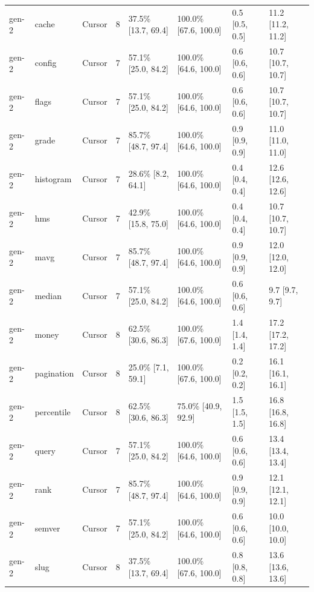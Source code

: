 \begin{tabular}{llllllll}
gen-2 & cache & Cursor & 8 & 37.5\% [13.7, 69.4] & 100.0\% [67.6, 100.0] & 0.5 [0.5, 0.5] & 11.2 [11.2, 11.2] \\
gen-2 & config & Cursor & 7 & 57.1\% [25.0, 84.2] & 100.0\% [64.6, 100.0] & 0.6 [0.6, 0.6] & 10.7 [10.7, 10.7] \\
gen-2 & flags & Cursor & 7 & 57.1\% [25.0, 84.2] & 100.0\% [64.6, 100.0] & 0.6 [0.6, 0.6] & 10.7 [10.7, 10.7] \\
gen-2 & grade & Cursor & 7 & 85.7\% [48.7, 97.4] & 100.0\% [64.6, 100.0] & 0.9 [0.9, 0.9] & 11.0 [11.0, 11.0] \\
gen-2 & histogram & Cursor & 7 & 28.6\% [8.2, 64.1] & 100.0\% [64.6, 100.0] & 0.4 [0.4, 0.4] & 12.6 [12.6, 12.6] \\
gen-2 & hms & Cursor & 7 & 42.9\% [15.8, 75.0] & 100.0\% [64.6, 100.0] & 0.4 [0.4, 0.4] & 10.7 [10.7, 10.7] \\
gen-2 & mavg & Cursor & 7 & 85.7\% [48.7, 97.4] & 100.0\% [64.6, 100.0] & 0.9 [0.9, 0.9] & 12.0 [12.0, 12.0] \\
gen-2 & median & Cursor & 7 & 57.1\% [25.0, 84.2] & 100.0\% [64.6, 100.0] & 0.6 [0.6, 0.6] & 9.7 [9.7, 9.7] \\
gen-2 & money & Cursor & 8 & 62.5\% [30.6, 86.3] & 100.0\% [67.6, 100.0] & 1.4 [1.4, 1.4] & 17.2 [17.2, 17.2] \\
gen-2 & pagination & Cursor & 8 & 25.0\% [7.1, 59.1] & 100.0\% [67.6, 100.0] & 0.2 [0.2, 0.2] & 16.1 [16.1, 16.1] \\
gen-2 & percentile & Cursor & 8 & 62.5\% [30.6, 86.3] & 75.0\% [40.9, 92.9] & 1.5 [1.5, 1.5] & 16.8 [16.8, 16.8] \\
gen-2 & query & Cursor & 7 & 57.1\% [25.0, 84.2] & 100.0\% [64.6, 100.0] & 0.6 [0.6, 0.6] & 13.4 [13.4, 13.4] \\
gen-2 & rank & Cursor & 7 & 85.7\% [48.7, 97.4] & 100.0\% [64.6, 100.0] & 0.9 [0.9, 0.9] & 12.1 [12.1, 12.1] \\
gen-2 & semver & Cursor & 7 & 57.1\% [25.0, 84.2] & 100.0\% [64.6, 100.0] & 0.6 [0.6, 0.6] & 10.0 [10.0, 10.0] \\
gen-2 & slug & Cursor & 8 & 37.5\% [13.7, 69.4] & 100.0\% [67.6, 100.0] & 0.8 [0.8, 0.8] & 13.6 [13.6, 13.6] \\
\bottomrule
\end{tabular}
